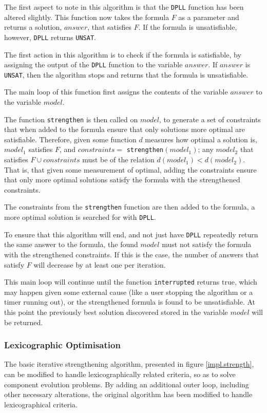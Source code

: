 The first aspect to note in this algorithm is that the \verb+DPLL+ function has been altered slightly.
This function now takes the formula $F$ as a parameter and returns a solution, $answer$, that satisfies $F$. 
If the formula is unsatisfiable, however, \verb+DPLL+ returns \verb+UNSAT+.

The first action in this algorithm is to check if the formula is satisfiable, by assigning the output of the \verb+DPLL+ function to the variable $answer$.
If $answer$ is \verb+UNSAT+, then the algorithm stops and returns that the formula is unsatisfiable.

The main loop of this function first assigns the contents of the variable $answer$ to the variable $model$.

The function \verb+strengthen+ is then called on $model$, to generate a set of constraints that when added to the formula ensure that only solutions more optimal are satisfiable.
Therefore, given some function $d$ measures how optimal a solution is, $model_1$ satisfies $F$, and $constraints = $ \verb+strengthen+$(model_1)$;
any $model_2$ that satisfies $F \cup constraints$ must be of the relation $d(model_1) < d(model_2)$.
That is, that given some measurement of optimal, adding the constraints ensure that only more optimal solutions satisfy the formula with the strengthened constraints. 

The constraints from the \verb+strengthen+ function are then added to the formula, a more optimal solution is searched for with \verb+DPLL+.

To ensure that this algorithm will end, and not just have \verb+DPLL+ repeatedly return the same answer to the formula, 
the found $model$ must not satisfy the formula with the strengthened constraints.
If this is the case, the number of answers that satisfy $F$ will decrease by at least one per iteration.

This main loop will continue until the function \verb+interrupted+ returns true, which may happen given some external cause (like a user stopping the algorithm or a timer running out),
or the strengthened formula is found to be unsatisfiable.
At this point the previously best solution discovered stored in the variable $model$ will be returned.

\subsubsection{Lexicographic Optimisation}
The basic iterative strengthening algorithm, presented in figure \ref{impl.strength}, can be modified to handle lexicographically related criteria, so as to solve component evolution problems.
By adding an additional outer loop, including other necessary alterations, the original algorithm has been modified to handle lexicographical criteria.

